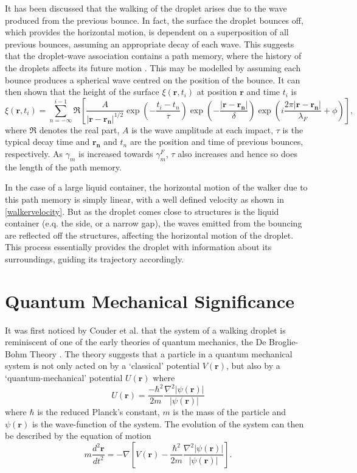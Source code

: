 \documentclass[11pt]{article}
\begin{document}
It has been discussed that the walking of the droplet arises due to the wave produced from the previous bounce.  In fact, the surface the droplet bounces off, which provides the horizontal motion, is dependent on a superposition of all previous bounces, assuming an appropriate decay of each wave.  This suggests that the droplet-wave association contains a path memory, where the history of the droplets affects its future motion \cite{8}.  This may be modelled by assuming each bounce produces a spherical wave centred on the position of the bounce.  It can then shown that the height of the surface $\xi(\bm{r},t_i)$ at position $\bm{r}$ and time $t_i$ is
\begin{equation}
    \label{pathmemory}
    \xi(\bm{r},t_i)= \sum_{n=-\infty}^{i-1}\Re\left[\frac{A}{\left|\bm{r}-\bm{r_n}\right|^{1/2}}\exp\left(-\frac{t_i-t_n}{\tau}\right)\exp\left(-\frac{\left|\bm{r}-\bm{r_n}\right|}{\delta}\right)\exp\left(i\frac{2\pi\left|\bm{r}-\bm{r_n}\right|}{\lambda_F}+\phi\right)\right],
\end{equation}
where $\Re$ denotes the real part, $A$ is the wave amplitude at each impact, $\tau$ is the typical decay time and $\bm{r_n}$ and $t_n$ are the position and time of previous bounces, respectively.  As $\gamma_m$ is increased towards $\gamma_m^F$, $\tau$ also increases and hence so does the length of the path memory.

In the case of a large liquid container, the horizontal motion of the walker due to this path memory is simply linear, with a well defined velocity as shown in \eqref{walkervelocity}.  But as the droplet comes close to structures is the liquid container (e.q. the side, or a narrow gap), the waves emitted from the bouncing are reflected off the structures, affecting the horizontal motion of the droplet.  This process essentially provides the droplet with information about its surroundings, guiding its trajectory accordingly.

\section{Quantum Mechanical Significance}
\label{sec:quantummechanicalsignificance}
It was first noticed by Couder et al.\cite{1} that the system of a walking droplet is reminiscent of one of the early theories of quantum mechanics, the De Broglie-Bohm Theory \cite{17}.  The theory suggests that a particle in a quantum mechanical system is not only acted on by a `classical' potential $V(\bm{r})$, but also by a `quantum-mechanical' potential $U(\bm{r})$ where
\begin{equation}
    \label{qmpotential}
    U(\bm{r})=\frac{-\hbar^2}{2m}\frac{\nabla^2\left|\psi(\bm{r})\right|}{\left|\psi(\bm{r})\right|}
\end{equation}
where $\hbar$ is the reduced Planck's constant, $m$ is the mass of the particle and $\psi(\bm{r})$ is the wave-function of the system.  The evolution of the system can then be described by the equation of motion
\begin{equation}
    \label{qmeqofmotion}
    m\frac{d^2\bm{r}}{dt^2}=-\nabla\left[V(\bm{r})-\frac{\hbar^2}{2m}\frac{\nabla^2\left|\psi(\bm{r})\right|}{\left|\psi(\bm{r})\right|}\right].
\end{equation}
\end{document}
